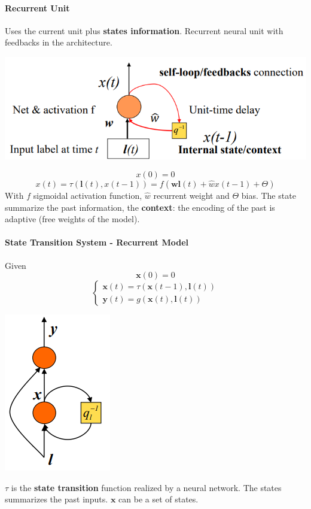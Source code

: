 \documentclass[10pt]{report}
\begin{document}
\paragraph{Recurrent Unit} Uses the current unit plus \textbf{states information}. Recurrent neural unit with feedbacks in the architecture.
\begin{center}
	\includegraphics[scale=0.5]{35.png}
\end{center}
$$x(0) = 0$$
$$x(t) = \tau(\mathbf{l}(t),x(t-1)) = f(\mathbf{wl}(t) + \hat{w}x(t-1) + \Theta)$$
With $f$ sigmoidal activation function, $\hat{w}$ recurrent weight and $\Theta$ bias. The state summarize the past information, the \textbf{context}: the encoding of the past is adaptive (free weights of the model).
\paragraph{State Transition System - Recurrent Model} Given $$\mathbf{x}(0) = 0$$ $$\left\{\begin{array}{l}
\mathbf{x}(t) = \tau(\mathbf{x}(t-1),\mathbf{l}(t))\\
\mathbf{y}(t) = g(\mathbf{x}(t), \mathbf{l}(t))
\end{array}\right.$$
\begin{center}
	\includegraphics[scale=0.5]{36.png}
\end{center}
$\tau$ is the \textbf{state transition} function realized by a neural network. The states summarizes the past inputs. $\mathbf{x}$ can be a set of states.
\end{document}
